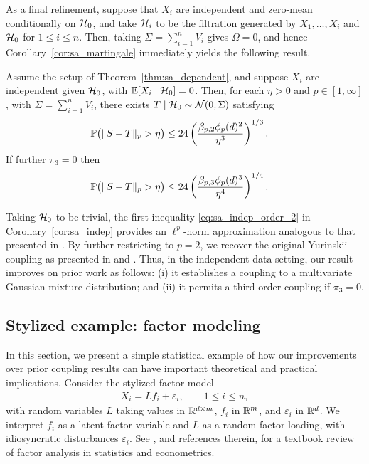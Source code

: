 As a final refinement, suppose that $X_i$ are independent and
zero-mean conditionally on $\cH_0$,
and take $\cH_i$ to be the filtration
generated by $X_1, \ldots, X_i$ and $\cH_0$ for $1 \leq i \leq n$.
Then, taking $\Sigma = \sum_{i=1}^n V_i$
gives $\Omega = 0$, and hence Corollary~\ref{cor:sa_martingale}
immediately yields the following result.
%
\begin{corollary}%
  \label{cor:sa_indep}

  Assume the setup of Theorem~\ref{thm:sa_dependent},
  and suppose $X_i$ are independent given $\cH_0$,
  with $\E[X_i \mid \cH_0] = 0$.
  Then, for each $\eta > 0$ and $p \in [1,\infty]$,
  with $\Sigma = \sum_{i=1}^n V_i$,
  there exists $T \mid \cH_0 \sim \cN(0, \Sigma)$ satisfying
  \begin{align}
    \label{eq:sa_indep_order_2}
    \P\big(\|S-T\|_p > \eta\big)
    &\leq
    24 \left(
      \frac{\beta_{p,2} \phi_p(d)^2}{\eta^3}
    \right)^{1/3}.
  \end{align}
  If further $\pi_3 = 0$ then
  \begin{align*}
    \P\big(\|S-T\|_p > \eta\big)
    &\leq
    24 \left(
      \frac{\beta_{p,3} \phi_p(d)^3}{\eta^4}
    \right)^{1/4}.
  \end{align*}
\end{corollary}

Taking $\cH_0$ to be trivial, the first inequality \eqref{eq:sa_indep_order_2}
in Corollary~\ref{cor:sa_indep} provides an $\ell^p$-norm approximation
analogous to that presented in \cite{belloni2019conditional}. By further
restricting to $p=2$, we recover the original Yurinskii coupling as presented
in \citet[Theorem~1]{lecam1988} and \citet[Theorem~10]{pollard2002user}. Thus,
in the independent data setting, our result improves on prior work as follows:
(i) it establishes a coupling to a multivariate Gaussian mixture distribution;
and (ii) it permits a third-order coupling if $\pi_3=0$.

\subsection{Stylized example: factor modeling}
\label{sec:factor}

In this section, we present a simple statistical example of how our
improvements over prior coupling results can have important theoretical and
practical implications. Consider the stylized factor model
%
\begin{align*}
  X_i = L f_i + \varepsilon_i, \qquad 1 \leq i \leq n,
\end{align*}
%
with random variables $L$ taking values in $\R^{d \times m}$, $f_i$ in $\R^m$,
and $\varepsilon_i$ in $\R^d$. We interpret $f_i$ as a latent factor variable
and $L$ as a random factor loading, with idiosyncratic disturbances
$\varepsilon_i$. See \citet{fan2020statistical}, and references therein, for a
textbook review of factor analysis in statistics and econometrics.

